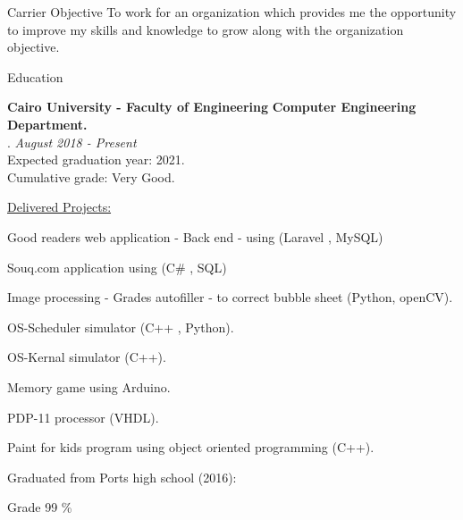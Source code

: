 \documentclass{resume}
\begin{document}

\begin{rSection}{Carrier Objective}
    To work for an organization which provides me the opportunity to improve my skills and knowledge to grow along with the organization objective.
\end{rSection}


\begin{rSection}{Education}

\textbf{Cairo University \-- Faculty of Engineering} \textbf{Computer Engineering Department.} \\. \hfill {\em August 2018 - Present} 
\\ Expected graduation year: 2021.
\\ Cumulative grade: Very Good.\\

\begin{rSubsection}{\underline{Delivered Projects:}}{}{}{}
    \item Good readers web application - Back end - using (Laravel , MySQL)
    \item Souq.com application using (C\# , SQL)
    \item Image processing - Grades autofiller - to correct bubble sheet (Python, openCV).
    \item OS-Scheduler simulator (C++ , Python).
    \item OS-Kernal simulator (C++).
    \item Memory game using Arduino.
    \item PDP-11 processor (VHDL).
    \item Paint for kids program using object oriented programming (C++).
\end{rSubsection}

\begin{rSubsection}{Graduated from Ports high school (2016):}{}{}{}
    \item Grade 99 \%
\end{rSubsection}

\end{rSection}
\end{document}
